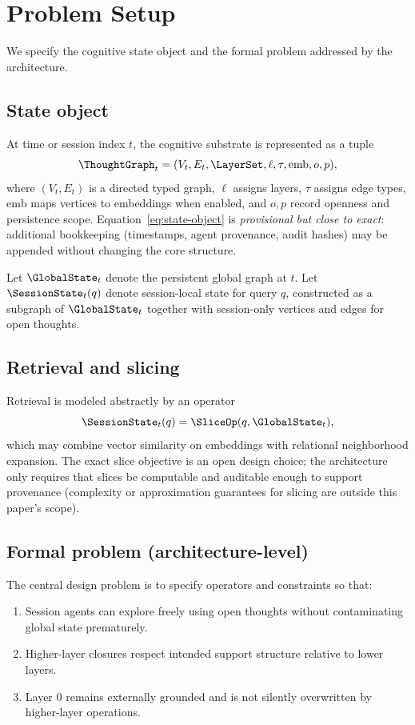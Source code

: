 \section{Problem Setup}
\label{sec:problem}

We specify the cognitive state object and the formal problem addressed by the architecture.

\subsection{State object}
At time or session index $t$, the cognitive substrate is represented as a tuple
\begin{equation}
\label{eq:state-object}
  \ThoughtGraph_t = (V_t, E_t, \LayerSet, \ell, \tau, \mathrm{emb}, o, p),
\end{equation}
where $(V_t,E_t)$ is a directed typed graph, $\ell$ assigns layers, $\tau$ assigns edge types, $\mathrm{emb}$ maps vertices to embeddings when enabled, and $o,p$ record openness and persistence scope.
Equation~\eqref{eq:state-object} is \emph{provisional but close to exact}: additional bookkeeping (timestamps, agent provenance, audit hashes) may be appended without changing the core structure.

Let $\GlobalState_t$ denote the persistent global graph at $t$.
Let $\SessionState_t(q)$ denote session-local state for query $q$, constructed as a subgraph of $\GlobalState_t$ together with session-only vertices and edges for open thoughts.

\subsection{Retrieval and slicing}
Retrieval is modeled abstractly by an operator
\[
  \SessionState_t(q) = \SliceOp(q, \GlobalState_t),
\]
which may combine vector similarity on embeddings with relational neighborhood expansion.
The exact slice objective is an open design choice; the architecture only requires that slices be computable and auditable enough to support provenance (complexity or approximation guarantees for slicing are outside this paper's scope).

\subsection{Formal problem (architecture-level)}
The central design problem is to specify operators and constraints so that:
\begin{enumerate}[leftmargin=*]
  \item Session agents can explore freely using open thoughts without contaminating global state prematurely.
  \item Higher-layer closures respect intended support structure relative to lower layers.
  \item Layer $0$ remains externally grounded and is not silently overwritten by higher-layer operations.
\end{enumerate}

